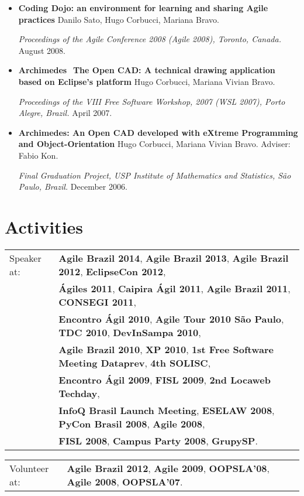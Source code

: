 \documentclass[letter,10pt]{article}
\begin{document}
\begin{itemize}
\item \textbf{Coding Dojo: an environment for learning and sharing
    Agile practices} Danilo Sato, Hugo Corbucci, Mariana Bravo.

  \textit{Proceedings of the Agile Conference 2008 (Agile 2008),
    Toronto, Canada.} August 2008.

\item \textbf{Archimedes ­ The Open CAD: A technical drawing
    application based on Eclipse's platform} Hugo Corbucci, Mariana
  Vivian Bravo.

  \textit{Proceedings of the VIII Free Software Workshop, 2007 (WSL
    2007), Porto Alegre, Brazil.} April 2007.

\item \textbf{Archimedes: An Open CAD developed with eXtreme
    Programming and Object-Orientation} Hugo Corbucci, Mariana Vivian
  Bravo. Adviser: Fabio Kon.

  \textit{Final Graduation Project, USP Institute of Mathematics and
    Statistics, São Paulo, Brazil.} December 2006.
\end{itemize}

\section{Activities}

\begin{tabular}{p{2.5cm}l}
  Speaker at: & \textbf{Agile Brazil 2014}, \textbf{Agile Brazil 2013}, \textbf{Agile Brazil 2012}, \textbf{EclipseCon 2012},\\
  & \textbf{Ágiles 2011}, \textbf{Caipira Ágil 2011}, \textbf{Agile Brazil 2011}, \textbf{CONSEGI 2011},\\
  & \textbf{Encontro Ágil 2010}, \textbf{Agile Tour 2010 São Paulo}, \textbf{TDC 2010}, \textbf{DevInSampa 2010},\\
  & \textbf{Agile Brazil 2010}, \textbf{XP 2010}, \textbf{1st Free Software Meeting Dataprev}, \textbf{4th SOLISC},\\
  & \textbf{Encontro Ágil 2009}, \textbf{FISL 2009}, \textbf{2nd Locaweb Techday},\\
  & \textbf{InfoQ Brasil Launch Meeting}, \textbf{ESELAW 2008}, \textbf{PyCon Brasil 2008}, \textbf{Agile 2008},\\
  & \textbf{FISL 2008}, \textbf{Campus Party 2008}, \textbf{GrupySP}.
\end{tabular}

\begin{tabular}{p{2.5cm}l}
  Volunteer at: & \textbf{Agile Brazil 2012}, \textbf{Agile 2009}, \textbf{OOPSLA'08}, \textbf{Agile 2008}, \textbf{OOPSLA'07}.
\end{tabular}
\end{document}
